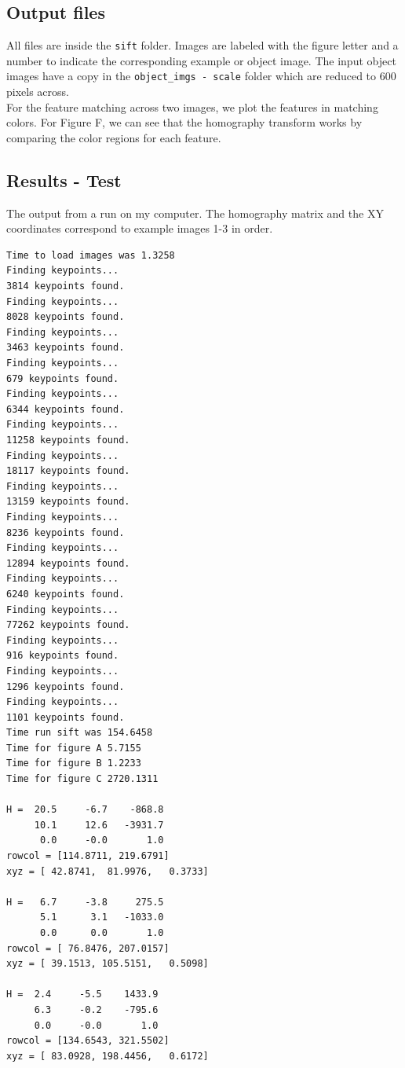 \documentclass[10pt, titlepage, onecolumn, fleqn]{article}
\begin{document}
\subsection{Output files}
All files are inside the \verb|sift| folder. Images are labeled with the figure letter and a number to indicate the corresponding example or object image. The input object images have a copy in the \verb|object_imgs - scale| folder which are reduced to 600 pixels across.\\
For the feature matching across two images, we plot the features in matching colors. For Figure F, we can see that the homography transform works by comparing the color regions for each feature.

\subsection{Results - Test}

The output from a run on my computer. The homography matrix and the XY coordinates correspond to example images 1-3 in order.
\begin{verbatim}
Time to load images was 1.3258
Finding keypoints... 
3814 keypoints found. 
Finding keypoints... 
8028 keypoints found. 
Finding keypoints... 
3463 keypoints found. 
Finding keypoints... 
679 keypoints found. 
Finding keypoints... 
6344 keypoints found. 
Finding keypoints... 
11258 keypoints found. 
Finding keypoints... 
18117 keypoints found. 
Finding keypoints... 
13159 keypoints found. 
Finding keypoints... 
8236 keypoints found. 
Finding keypoints... 
12894 keypoints found. 
Finding keypoints... 
6240 keypoints found. 
Finding keypoints... 
77262 keypoints found. 
Finding keypoints... 
916 keypoints found. 
Finding keypoints... 
1296 keypoints found. 
Finding keypoints... 
1101 keypoints found. 
Time run sift was 154.6458
Time for figure A 5.7155
Time for figure B 1.2233
Time for figure C 2720.1311

H =  20.5     -6.7    -868.8
     10.1     12.6   -3931.7
      0.0     -0.0       1.0
rowcol = [114.8711, 219.6791]
xyz = [ 42.8741,  81.9976,   0.3733]

H =   6.7     -3.8     275.5
      5.1      3.1   -1033.0
      0.0      0.0       1.0
rowcol = [ 76.8476, 207.0157]
xyz = [ 39.1513, 105.5151,   0.5098]

H =  2.4     -5.5    1433.9
     6.3     -0.2    -795.6
     0.0     -0.0       1.0
rowcol = [134.6543, 321.5502]
xyz = [ 83.0928, 198.4456,   0.6172]
\end{verbatim}
\end{document}
